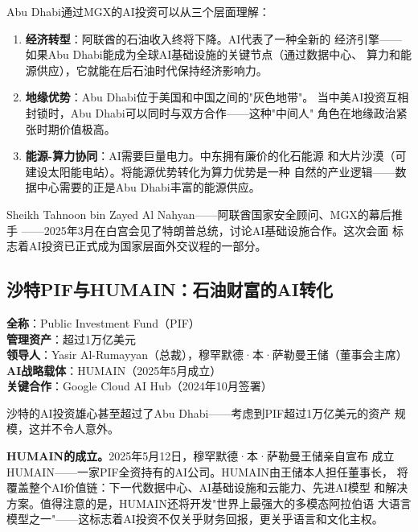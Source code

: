 \begin{whybox}
Abu Dhabi通过MGX的AI投资可以从三个层面理解：
\begin{enumerate}
  \item \textbf{经济转型}：阿联酋的石油收入终将下降。AI代表了一种全新的
    经济引擎——如果Abu Dhabi能成为全球AI基础设施的关键节点（通过数据中心、
    算力和能源供应），它就能在后石油时代保持经济影响力。
  \item \textbf{地缘优势}：Abu Dhabi位于美国和中国之间的"灰色地带"。
    当中美AI投资互相封锁时，Abu Dhabi可以同时与双方合作——这种"中间人"
    角色在地缘政治紧张时期价值极高。
  \item \textbf{能源-算力协同}：AI需要巨量电力。中东拥有廉价的化石能源
    和大片沙漠（可建设太阳能电站）。将能源优势转化为算力优势是一种
    自然的产业逻辑——数据中心需要的正是Abu Dhabi丰富的能源供应。
\end{enumerate}
Sheikh Tahnoon bin Zayed Al Nahyan——阿联酋国家安全顾问、MGX的幕后推手
——2025年3月在白宫会见了特朗普总统，讨论AI基础设施合作。这次会面
标志着AI投资已正式成为国家层面外交议程的一部分。
\end{whybox}


\subsection{沙特PIF与HUMAIN：石油财富的AI转化}
\label{subsec:inv-pif}

\begin{corebox}
\textbf{全称}：Public Investment Fund（PIF） \\
\textbf{管理资产}：超过1万亿美元 \\
\textbf{领导人}：Yasir Al-Rumayyan（总裁），穆罕默德·本·萨勒曼王储（董事会主席） \\
\textbf{AI战略载体}：HUMAIN（2025年5月成立） \\
\textbf{关键合作}：Google Cloud AI Hub（2024年10月签署）
\end{corebox}

沙特的AI投资雄心甚至超过了Abu Dhabi——考虑到PIF超过1万亿美元的资产
规模，这并不令人意外。

\textbf{HUMAIN的成立。}2025年5月12日，穆罕默德·本·萨勒曼王储亲自宣布
成立HUMAIN——一家PIF全资持有的AI公司。HUMAIN由王储本人担任董事长，
将覆盖整个AI价值链：下一代数据中心、AI基础设施和云能力、先进AI模型
和解决方案。值得注意的是，HUMAIN还将开发"世界上最强大的多模态阿拉伯语
大语言模型之一"——这标志着AI投资不仅关乎财务回报，更关乎语言和文化主权。

